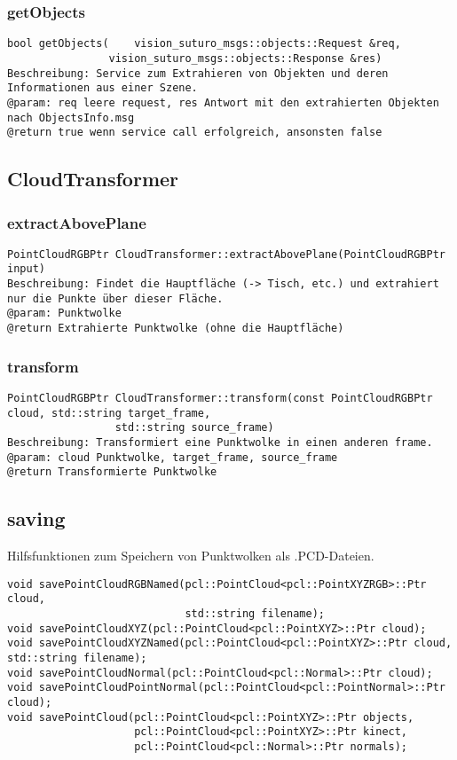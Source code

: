 \documentclass{suturo}
\begin{document}
\subsubsection{getObjects}
\begin{verbatim}
bool getObjects(	vision_suturo_msgs::objects::Request &req, 
			    vision_suturo_msgs::objects::Response &res)
Beschreibung: Service zum Extrahieren von Objekten und deren Informationen aus einer Szene.
@param: req leere request, res Antwort mit den extrahierten Objekten nach ObjectsInfo.msg
@return true wenn service call erfolgreich, ansonsten false
\end{verbatim}\label{func:getobjects}


\subsection*{CloudTransformer}

\subsubsection{extractAbovePlane}
\begin{verbatim}
PointCloudRGBPtr CloudTransformer::extractAbovePlane(PointCloudRGBPtr input)
Beschreibung: Findet die Hauptfläche (-> Tisch, etc.) und extrahiert nur die Punkte über dieser Fläche.
@param: Punktwolke
@return Extrahierte Punktwolke (ohne die Hauptfläche)
\end{verbatim}\label{func:extractaboveplane}
\subsubsection{transform}
\begin{verbatim}
PointCloudRGBPtr CloudTransformer::transform(const PointCloudRGBPtr cloud, std::string target_frame,
                 std::string source_frame)
Beschreibung: Transformiert eine Punktwolke in einen anderen frame.
@param: cloud Punktwolke, target_frame, source_frame
@return Transformierte Punktwolke
\end{verbatim}\label{func:transform}

\subsection*{saving}
Hilfsfunktionen zum Speichern von Punktwolken als .PCD-Dateien.

\begin{verbatim}
void savePointCloudRGBNamed(pcl::PointCloud<pcl::PointXYZRGB>::Ptr cloud,
                            std::string filename);
void savePointCloudXYZ(pcl::PointCloud<pcl::PointXYZ>::Ptr cloud);
void savePointCloudXYZNamed(pcl::PointCloud<pcl::PointXYZ>::Ptr cloud, std::string filename);
void savePointCloudNormal(pcl::PointCloud<pcl::Normal>::Ptr cloud);
void savePointCloudPointNormal(pcl::PointCloud<pcl::PointNormal>::Ptr cloud);
void savePointCloud(pcl::PointCloud<pcl::PointXYZ>::Ptr objects,
                    pcl::PointCloud<pcl::PointXYZ>::Ptr kinect,
                    pcl::PointCloud<pcl::Normal>::Ptr normals);
\end{verbatim}
\end{document}
